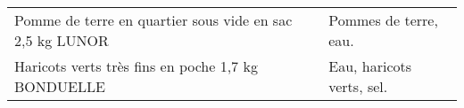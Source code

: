 \begin{longtable}{p{5cm}p{10cm}}
                                                 Pomme de terre en quartier sous vide en sac 2,5 kg LUNOR &                                                                                                                                                                                                                                                                                                                                                                                                                                                                                                                                                                                                                                                                                                                                                                                                                                                                                                                                                                                                                    Pommes de terre, eau. \\
                                                       Haricots verts très fins en poche 1,7 kg BONDUELLE &                                                                                                                                                                                                                                                                                                                                                                                                                                                                                                                                                                                                                                                                                                                                                                                                                                                                                                                                                                                                                Eau, haricots verts, sel. \\

\end{longtable}
